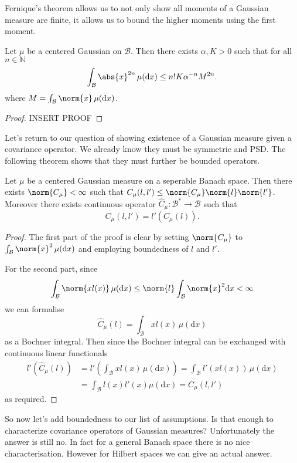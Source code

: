 \documentclass[fontsize=12pt, DIV=10]{scrreprt}
\theoremstyle{remark}
\newcommand{\N}{\mathbb N}
\newcommand{\calB}{\mathcal B}
\newcommand{\dif}[1]{\text{d} #1}
\begin{document}
Fernique's theorem allows us to not only show all moments of a Gaussian measure are finite, it allows us to bound the higher moments using the first moment.

\begin{prop}
	\label{prop:bounded-moments}
	Let $\mu$ be a centered Gaussian on $\calB$. Then there exists $\alpha, K > 0$ such that for all $n \in \N$
	\begin{equation}
		\int_{\calB} \abs{x}^{2n} \, \mu(\dif x) \leq n! K \alpha^{-n} M^{2n}.
	\end{equation}
	where $M = \int_{\calB} \norm{x} \, \mu(\dif x)$.
\end{prop}
\begin{proof}
	INSERT PROOF
\end{proof}

Let's return to our question of showing existence of a Gaussian measure given a covariance operator. We already know they must be symmetric and PSD. The following theorem shows that they must further be bounded operators.
\begin{prop}
	\label{prop:bounded-cov}
	Let $\mu$ be a centered Gaussian measure on a seperable Banach space. Then there exists $\norm{C_{\mu}} < \infty$ such that $C_{\mu}(l, l') \leq \norm{C_{\mu}} \norm{l} \norm{l'}$. Moreover there exists continuous operator $\hat{C}_{\mu}: \calB^* \to \calB$ such that
	\begin{equation}
		C_{\mu}(l, l') = l'\left(C_{\mu}(l) \right).
	\end{equation}
\end{prop}
\begin{proof}
	The first part of the proof is clear by setting $\norm{C_{\mu}}$ to $\int_{\calB} \norm{x}^2 \, \mu(\dif x)$ and employing boundedness of $l$ and $l'$.

	For the second part, since
	\begin{equation}
		\int_{\calB} \norm{x l(x)} \, \mu(\dif x) \leq \norm{l} \int_{\calB} \norm{x}^2 \dif x < \infty
	\end{equation}
	we can formalise
	\begin{equation}
		\hat{C}_{\mu}(l) = \int_{\calB} x l(x) \, \mu(\dif x)
	\end{equation}
	as a Bochner integral. Then since the Bochner integral can be exchanged with continuous linear functionals
	\begin{align}
		l'(\hat{C}_{\mu}(l))
		&= l' \left( \int_{\calB} x l(x) \, \mu(\dif x)\right)
		= \int_{\calB} l'(x l(x)) \, \mu(\dif x) \nonumber \\
		&= \int_{\calB} l(x) l'(x) \mu(\dif x)
		= C_{\mu}(l, l')
	\end{align}
	as required.
\end{proof}
So now let's add boundedness to our list of assumptions. Is that enough to characterize covariance operators of Gaussian measures? Unfortunately the answer is still no. In fact for a general Banach space there is no nice characterisation. However for Hilbert spaces we can give an actual answer.
\end{document}
